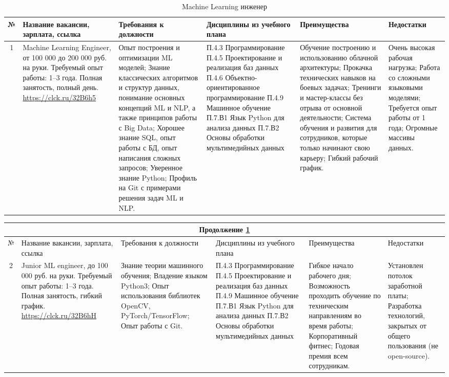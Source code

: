 \documentclass[14pt]{extreport}
\begin{document}
\begin{landscape}
\begin{table}[H]
\caption{Machine Learning инженер}
\label{tab_mldev}
	\begin{tabular}{|c|p{3.3cm}|p{6cm}|p{4.7cm}|p{5.5cm}|p{3.5cm}|}
	\hline № & {Название вакансии, зарплата, ссылка} & {Требования к должности} & {Дисциплины из учебного плана} & {Преимущества} & {Недостатки} \\
	\hline 1 & {Machine Learning Engineer,
от 100 000 до 200 000 руб. на руки.
Требуемый опыт работы: 1–3 года.
Полная занятость, полный день. \url{https://clck.ru/32B6h5}} & {Опыт построения и оптимизации ML моделей;
Знание классических алгоритмов и структур данных, понимание основных концепций ML и NLP, а также принципов работы с Big Data;
Хорошее знание SQL, опыт работы с БД, опыт написания сложных запросов;
Уверенное знание Python;
Профиль на Git с примерами решения задач ML и NLP.} & {П.4.3 Программирование
П.4.5 Проектирование и реализация баз данных
П.4.6 Объектно-ориентированное программирование
П.4.9 Машинное обучение
П.7.В1 Язык Python для анализа данных
П.7.В2 Основы обработки мультимедийных данных} & {Обучение построению и использованию облачной архитектуры;
Прокачка технических навыков на боевых задачах;
Тренинги и мастер-классы без отрыва от основной деятельности;
Система обучения и развития для сотрудников, которые только начинают свою карьеру;
Гибкий рабочий график.} & {Очень высокая рабочая нагрузка;
Работа со сложными языковыми моделями;
Требуется опыт работы от 1 года;
Огромные массивы данных.} \\
	\hline
	\end{tabular}
\end{table}

\begin{table}[H]
	\begin{tabular}{|c|p{3.3cm}|p{6cm}|p{4.7cm}|p{5.5cm}|p{3.5cm}|}
	\multicolumn{6}{c}{Продолжение \ref{tab_mldev}} \\
	\hline № & {Название вакансии, зарплата, ссылка} & {Требования к должности} & {Дисциплины из учебного плана} & {Преимущества} & {Недостатки} \\
 	\hline 2 & {Junior ML engineer,
до 100 000 руб. на руки.
Требуемый опыт работы: 1–3 года.
Полная занятость, гибкий график. \url{https://clck.ru/32B6hH}} & {Знание теории машинного обучения;
Владение языком Python3;
Опыт использования библиотек OpenCV, PyTorch/TensorFlow;
Опыт работы с Git.} & {П.4.3 Программирование
П.4.5 Проектирование и реализация баз данных
П.4.9 Машинное обучение
П.7.В1 Язык Python для анализа данных
П.7.В2 Основы обработки мультимедийных данных} & {Гибкое начало рабочего дня;
Возможность проходить обучение по техническим направлениям во время работы;
Корпоративный фитнес;
Годовая премия всем сотрудникам.} & {Установлен потолок заработной платы;
Разработка технологий, закрытых от общего пользования (не open-source).} \\
	\hline
	\end{tabular}
\end{table}


\end{landscape}
\end{document}
